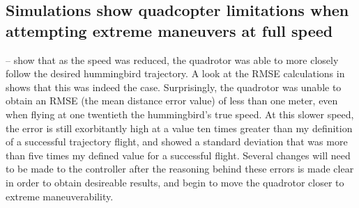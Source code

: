 \documentclass[onecolumn,10pt]{IEEEtran}
\begin{document}
\subsection{Simulations show quadcopter limitations when attempting extreme maneuvers at full speed}
-- show that as the speed was reduced, the quadrotor was able to more closely follow the desired hummingbird trajectory. A look at the RMSE calculations in  shows that this was indeed the case. Surprisingly, the quadrotor was unable to obtain an RMSE (the mean distance error value) of less than one meter, even when flying at one twentieth the hummingbird's true speed. At this slower speed, the error is still exorbitantly high at a value ten times greater than my definition of a successful trajectory flight, and showed a standard deviation that was more than five times my defined value for a successful flight. Several changes will need to be made to the controller after the reasoning behind these errors is made clear in order to obtain desireable results, and begin to move the quadrotor closer to extreme maneuverability.

\end{document}
